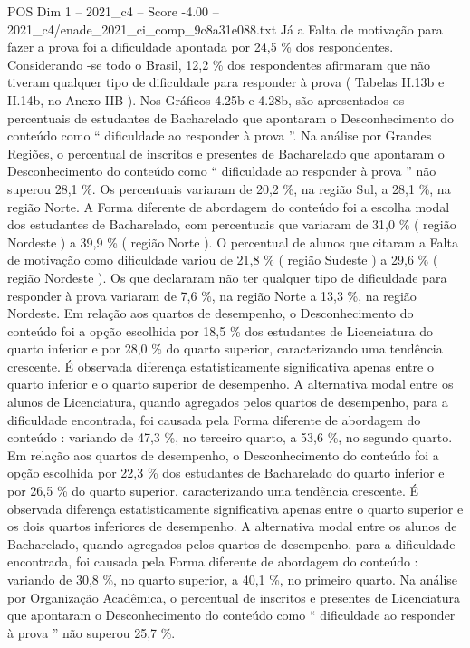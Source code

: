 \begin{textsample}{POS Dim 1 – 2021\_c4 – Score -4.00 – 2021\_c4/enade\_2021\_ci\_comp\_9c8a31e088.txt}
Já a Falta de motivação para fazer a prova foi a dificuldade apontada por 24,5 \% dos respondentes.
Considerando -se todo o Brasil, 12,2 \% dos respondentes afirmaram que não tiveram qualquer tipo de dificuldade para responder à prova ( Tabelas II.13b e II.14b, no Anexo IIB ).
Nos Gráficos 4.25b e 4.28b, são apresentados os percentuais de estudantes de Bacharelado que apontaram o Desconhecimento do conteúdo como “ dificuldade ao responder à prova ”.
Na análise por Grandes Regiões, o percentual de inscritos e presentes de Bacharelado que apontaram o Desconhecimento do conteúdo como “ dificuldade ao responder à prova ” não superou 28,1 \%.
Os percentuais variaram de 20,2 \%, na região Sul, a 28,1 \%, na região Norte.
A Forma diferente de abordagem do conteúdo foi a escolha modal dos estudantes de Bacharelado, com percentuais que variaram de 31,0 \% ( região Nordeste ) a 39,9 \% ( região Norte ).
O percentual de alunos que citaram a Falta de motivação como dificuldade variou de 21,8 \% ( região Sudeste ) a 29,6 \% ( região Nordeste ).
Os que declararam não ter qualquer tipo de dificuldade para responder à prova variaram de 7,6 \%, na região Norte a 13,3 \%, na região Nordeste.
Em relação aos quartos de desempenho, o Desconhecimento do conteúdo foi a opção escolhida por 18,5 \% dos estudantes de Licenciatura do quarto inferior e por 28,0 \% do quarto superior, caracterizando uma tendência crescente.
É observada diferença estatisticamente significativa apenas entre o quarto inferior e o quarto superior de desempenho.
A alternativa modal entre os alunos de Licenciatura, quando agregados pelos quartos de desempenho, para a dificuldade encontrada, foi causada pela Forma diferente de abordagem do conteúdo : variando de 47,3 \%, no terceiro quarto, a 53,6 \%, no segundo quarto.
Em relação aos quartos de desempenho, o Desconhecimento do conteúdo foi a opção escolhida por 22,3 \% dos estudantes de Bacharelado do quarto inferior e por 26,5 \% do quarto superior, caracterizando uma tendência crescente.
É observada diferença estatisticamente significativa apenas entre o quarto superior e os dois quartos inferiores de desempenho.
A alternativa modal entre os alunos de Bacharelado, quando agregados pelos quartos de desempenho, para a dificuldade encontrada, foi causada pela Forma diferente de abordagem do conteúdo : variando de 30,8 \%, no quarto superior, a 40,1 \%, no primeiro quarto.
Na análise por Organização Acadêmica, o percentual de inscritos e presentes de Licenciatura que apontaram o Desconhecimento do conteúdo como “ dificuldade ao responder à prova ” não superou 25,7 \%.

\end{textsample}
